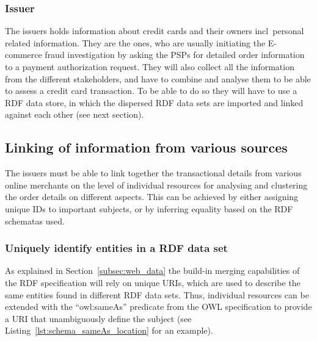 \subsubsection{Issuer}
\label{subsub:prep_info_issuer}

The issuers holds information about credit cards and their owners \gls{incl}\ personal related information. They are the ones, who are usually initiating the \gls{E-commerce} fraud investigation by asking the \gls{PSP}s for detailed order information to a payment authorization request. They will also collect all the information from the different stakeholders, and have to combine and analyse them to be able to assess a credit card transaction. To be able to do so they will have to use a \gls{RDF} data store, in which the dispersed \gls{RDF} data sets are imported and linked against each other (see next section).

\subsection{Linking of information from various sources}
\label{subsec:information_mapping}

The issuers must be able to link together the transactional details from various online merchants on the level of individual resources for analysing and clustering the order details on different aspects. This can be achieved by either assigning unique IDs to important subjects, or by inferring equality based on the \gls{RDF} schematas used.

\subsubsection{Uniquely identify entities in a \gls{RDF} data set}
\label{subsub:info_unique_id}

As explained in Section~\ref{subsec:web_data} the build-in merging capabilities of the \gls{RDF} specification will rely on unique \gls{URI}s, which are used to describe the same entities found in different \gls{RDF} data sets. Thus, individual resources can be extended with the ``owl:sameAs'' predicate from the \gls{OWL} specification to provide a \gls{URI} that unambiguously define the subject (see Listing~\ref{lst:schema_sameAs_location} for an example). \@


